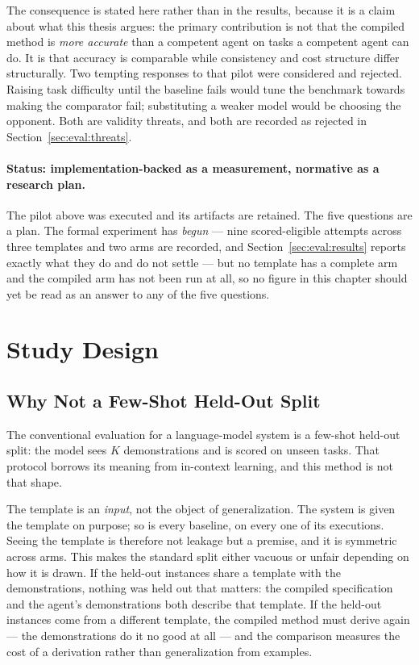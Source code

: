 The consequence is stated here rather than in the results, because it is a claim about what
this thesis argues: the primary contribution is not that the compiled method is \emph{more
accurate} than a competent agent on tasks a competent agent can do. It is that accuracy is
comparable while consistency and cost structure differ structurally. Two tempting responses
to that pilot were considered and rejected. Raising task difficulty until the baseline fails
would tune the benchmark towards making the comparator fail; substituting a weaker model
would be choosing the opponent. Both are validity threats, and both are recorded as rejected
in Section~\ref{sec:eval:threats}.

\paragraph{Status: implementation-backed as a measurement, normative as a research plan.}
The pilot above was executed and its artifacts are retained. The five questions are a plan.
The formal experiment has \emph{begun} --- nine scored-eligible attempts across three
templates and two arms are recorded, and Section~\ref{sec:eval:results} reports exactly what
they do and do not settle --- but no template has a complete arm and the compiled arm has not
been run at all, so no figure in this chapter should yet be read as an answer to any of the
five questions.

\section{Study Design}
\label{sec:eval:design}

\subsection{Why Not a Few-Shot Held-Out Split}
\label{sec:eval:whynotfewshot}

The conventional evaluation for a language-model system is a few-shot held-out split: the
model sees $K$ demonstrations and is scored on unseen tasks. That protocol borrows its
meaning from in-context learning, and this method is not that shape.

The template is an \emph{input}, not the object of generalization. The system is given the
template on purpose; so is every baseline, on every one of its executions. Seeing the
template is therefore not leakage but a premise, and it is symmetric across arms. This makes
the standard split either vacuous or unfair depending on how it is drawn. If the held-out
instances share a template with the demonstrations, nothing was held out that matters: the
compiled specification and the agent's demonstrations both describe that template. If the
held-out instances come from a different template, the compiled method must derive again ---
the demonstrations do it no good at all --- and the comparison measures the cost of a
derivation rather than generalization from examples.

